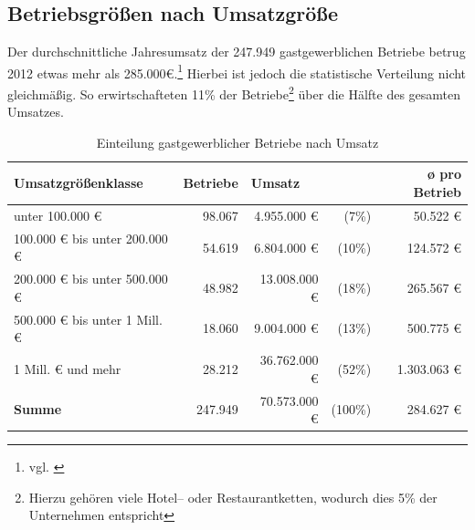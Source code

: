 \subsection{Betriebsgrößen nach Umsatzgröße} %
\label{sub:betriebsgrossen_nach_umsatzgrosse}
Der durchschnittliche Jahresumsatz der 247.949 gastgewerblichen Betriebe betrug 2012 etwas mehr als 285.000€.\footnote{vgl. \cite{destatis:genesis}} Hierbei ist jedoch die statistische Verteilung nicht gleichmäßig. So erwirtschafteten 11\% der Betriebe\footnote{Hierzu gehören viele Hotel– oder Restaurantketten, wodurch dies 5\% der Unternehmen entspricht} über die Hälfte des gesamten Umsatzes.

\begin{table}[H]
\begin{center}
\begin{footnotesize}
\begin{tabular}{| l | r | r  r | r |}  \hline                       
  \textbf{Umsatzgrößenklasse}            & \textbf{Betriebe} & \multicolumn{2}{|l|}{\textbf{Umsatz}}  & \textbf{ø pro Betrieb} \\ \hline 
  unter 100.000 €               & 98.067   &  4.955.000 € &   (7\%) &    50.522 € \\  \hline  
  100.000 € bis unter 200.000 € & 54.619   &  6.804.000 € &  (10\%) &   124.572 € \\  \hline  
  200.000 € bis unter 500.000 € & 48.982   & 13.008.000 € &  (18\%) &   265.567 € \\  \hline  
  500.000 € bis unter 1 Mill. € & 18.060   &  9.004.000 € &  (13\%) &   500.775 € \\  \hline  
  1 Mill. € und mehr            & 28.212   & 36.762.000 € &  (52\%) & 1.303.063 € \\  \hline  
  \textbf{Summe}                         & 247.949  & 70.573.000 € & (100\%) &   284.627 € \\  \hline  
\end{tabular}
\end{footnotesize}
\caption[Einteilung gastgewerblicher Betriebe nach Umsatz]{Einteilung gastgewerblicher Betriebe nach Umsatz\protect\footnotemark}
\label{tab:betriebsgroessen}
\end{center}
\end{table}

